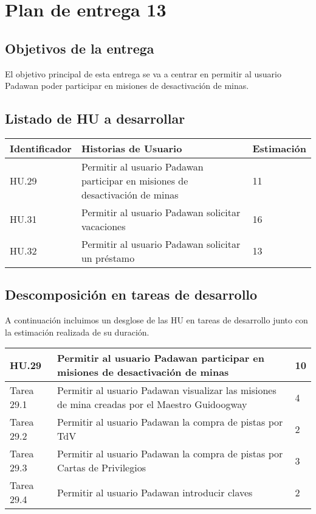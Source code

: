 \section{Plan de entrega 13}

\subsection{Objetivos de la entrega}

El objetivo principal de esta entrega se va a centrar en permitir al usuario Padawan poder participar en misiones de desactivación de minas.

\subsection{Listado de HU a desarrollar}

\begin{table}[h]
	\centering
	\begin{tabular}{| p{2.3cm} | p{6.7cm} | p{2cm} |}
		\rowcolor[HTML]{329A9D} 
		{\color[HTML]{FFFFFF} \textbf{Identificador}} & {\color[HTML]{FFFFFF} \textbf{Historias de Usuario}} & {\color[HTML]{FFFFFF} \textbf{Estimación}}  \\ \hline
		HU.29 & Permitir al usuario Padawan participar en misiones de desactivación de minas & 11 \\ \hline
		HU.31 & Permitir al usuario Padawan solicitar vacaciones & 16 \\ \hline
		HU.32 & Permitir al usuario Padawan solicitar un préstamo & 13 \\ \hline
	\end{tabular}
\end{table}

\subsection{Descomposición en tareas de desarrollo}

A continuación incluimos un desglose de las HU en tareas de desarrollo junto con la estimación realizada de su duración.\\

\begin{table}[h]
	\centering
	\begin{tabular}{| p{2.3cm} | p{6.7cm} | p{2cm} |}
		\rowcolor[HTML]{329A9D} 
		{\color[HTML]{FFFFFF} \textbf{HU.29}} & {\color[HTML]{FFFFFF} \textbf{Permitir al usuario Padawan participar en misiones de desactivación de minas}} & {\color[HTML]{FFFFFF} \textbf{10}}  \\ \hline
		Tarea 29.1 & Permitir al usuario Padawan visualizar las misiones de mina creadas por el Maestro Guidoogway & 4 \\ \hline
		Tarea 29.2 & Permitir al usuario Padawan la compra de pistas por TdV & 2 \\ \hline
		Tarea 29.3 & Permitir al usuario Padawan la compra de pistas por Cartas de Privilegios & 3 \\ \hline
		Tarea 29.4 & Permitir al usuario Padawan introducir claves  & 2 \\ \hline
	\end{tabular}
\end{table}

